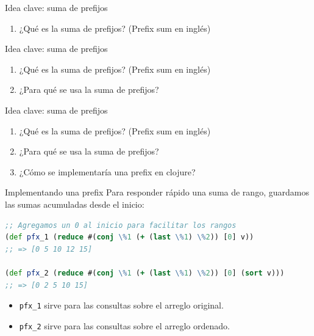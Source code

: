 \documentclass{beamer}
\begin{document}
\begin{frame}[fragile]{Idea clave: suma de prefijos}
    \begin{enumerate}
        \item ¿Qué es la suma de prefijos? (Prefix sum en inglés)
    \end{enumerate}
\end{frame}

\begin{frame}[fragile]{Idea clave: suma de prefijos}
    \begin{enumerate}
        \item ¿Qué es la suma de prefijos? (Prefix sum en inglés)
        \item ¿Para qué se usa la suma de prefijos?
    \end{enumerate}
\end{frame}

\begin{frame}[fragile]{Idea clave: suma de prefijos}
    \begin{enumerate}
        \item ¿Qué es la suma de prefijos? (Prefix sum en inglés)
        \item ¿Para qué se usa la suma de prefijos?
        \item ¿Cómo se implementaría una prefix en clojure?
    \end{enumerate}
\end{frame}


\begin{frame}[fragile]{Implementando una prefix}
    Para responder rápido una suma de rango, guardamos las sumas acumuladas desde el inicio:

    \begin{lstlisting}[language=Clojure]
;; Agregamos un 0 al inicio para facilitar los rangos
(def pfx_1 (reduce #(conj \%1 (+ (last \%1) \%2)) [0] v))
;; => [0 5 10 12 15]

(def pfx_2 (reduce #(conj \%1 (+ (last \%1) \%2)) [0] (sort v)))
;; => [0 2 5 10 15]
    \end{lstlisting}

    \begin{itemize}
        \item \texttt{pfx\_1} sirve para las consultas sobre el arreglo original.
        \item \texttt{pfx\_2} sirve para las consultas sobre el arreglo ordenado.
    \end{itemize}
\end{frame}
\end{document}
